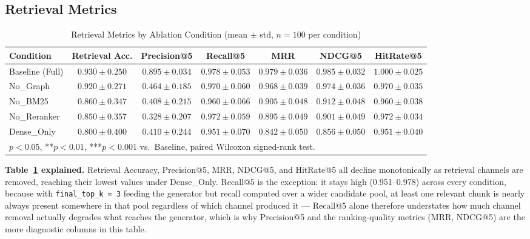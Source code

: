 \documentclass[conference]{IEEEtran}
\begin{document}
\subsection{Retrieval Metrics}

\begin{table}[t]
\centering
\caption{Retrieval Metrics by Ablation Condition (mean $\pm$ std, $n=100$ per condition)}
\label{tab:retrieval}
\begin{tabular}{@{}lcccccc@{}}
\toprule
\textbf{Condition} & \textbf{Retrieval Acc.} & \textbf{Precision@5} & \textbf{Recall@5} & \textbf{MRR} & \textbf{NDCG@5} & \textbf{HitRate@5} \\
\midrule
Baseline (Full)   & $0.930 \pm 0.250$ & $0.895 \pm 0.034$ & $0.978 \pm 0.053$ & $0.979 \pm 0.036$ & $0.985 \pm 0.032$ & $1.000 \pm 0.025$ \\
No\_Graph         & $0.920 \pm 0.271$ & $0.464 \pm 0.185$ & $0.970 \pm 0.060$ & $0.968 \pm 0.039$\rlap{***} & $0.974 \pm 0.036$\rlap{***} & $0.970 \pm 0.035$\rlap{***} \\
No\_BM25          & $0.860 \pm 0.347$\rlap{*} & $0.408 \pm 0.215$\rlap{*} & $0.960 \pm 0.066$\rlap{***} & $0.905 \pm 0.048$\rlap{***} & $0.912 \pm 0.048$\rlap{***} & $0.960 \pm 0.038$\rlap{***} \\
No\_Reranker      & $0.850 \pm 0.357$\rlap{*} & $0.328 \pm 0.207$\rlap{***} & $0.972 \pm 0.059$\rlap{*} & $0.895 \pm 0.049$\rlap{***} & $0.901 \pm 0.049$\rlap{***} & $0.972 \pm 0.034$\rlap{***} \\
Dense\_Only       & $0.800 \pm 0.400$\rlap{**} & $0.410 \pm 0.244$\rlap{*} & $0.951 \pm 0.070$\rlap{***} & $0.842 \pm 0.050$\rlap{***} & $0.856 \pm 0.050$\rlap{***} & $0.951 \pm 0.040$\rlap{***} \\
\bottomrule
\multicolumn{7}{l}{\footnotesize *$p<0.05$, **$p<0.01$, ***$p<0.001$ vs.\ Baseline, paired Wilcoxon signed-rank test.}
\end{tabular}
\end{table}

\textbf{Table~\ref{tab:retrieval} explained.} Retrieval Accuracy, Precision@5, MRR, NDCG@5, and HitRate@5 all decline monotonically as retrieval channels are removed, reaching their lowest values under Dense\_Only. Recall@5 is the exception: it stays high (0.951--0.978) across every condition, because with \texttt{final\_top\_k = 3} feeding the generator but recall computed over a wider candidate pool, at least one relevant chunk is nearly always present somewhere in that pool regardless of which channel produced it --- Recall@5 alone therefore understates how much channel removal actually degrades what reaches the generator, which is why Precision@5 and the ranking-quality metrics (MRR, NDCG@5) are the more diagnostic columns in this table.
\end{document}
